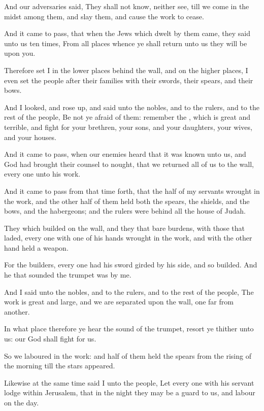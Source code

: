 \verse And our adversaries said, They shall not know, neither see, till we come in the midst among them, and slay them, and cause the work to cease.

\verse And it came to pass, that when the Jews which dwelt by them came, they said unto us ten times, From all places whence ye shall return unto us they will be upon you.

\verse Therefore set I in the lower places behind the wall, and on the higher places, I even set the people after their families with their swords, their spears, and their bows.

\verse And I looked, and rose up, and said unto the nobles, and to the rulers, and to the rest of the people, Be not ye afraid of them: remember the \LORD, which is great and terrible, and fight for your brethren, your sons, and your daughters, your wives, and your houses.

\verse And it came to pass, when our enemies heard that it was known unto us, and God had brought their counsel to nought, that we returned all of us to the wall, every one unto his work.

\verse And it came to pass from that time forth, that the half of my servants wrought in the work, and the other half of them held both the spears, the shields, and the bows, and the habergeons; and the rulers were behind all the house of Judah.

\verse They which builded on the wall, and they that bare burdens, with those that laded, every one with one of his hands wrought in the work, and with the other hand held a weapon.

\verse For the builders, every one had his sword girded by his side, and so builded. And he that sounded the trumpet was by me.

\verse And I said unto the nobles, and to the rulers, and to the rest of the people, The work is great and large, and we are separated upon the wall, one far from another.

\verse In what place therefore ye hear the sound of the trumpet, resort ye thither unto us: our God shall fight for us.

\verse So we laboured in the work: and half of them held the spears from the rising of the morning till the stars appeared.

\verse Likewise at the same time said I unto the people, Let every one with his servant lodge within Jerusalem, that in the night they may be a guard to us, and labour on the day.

